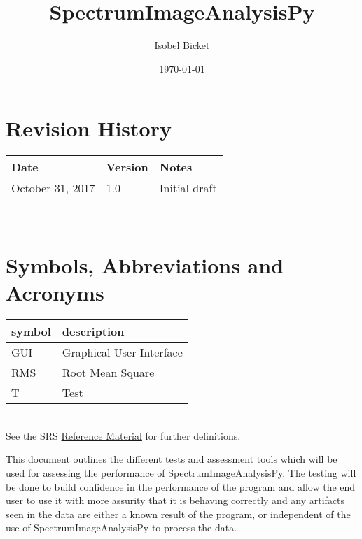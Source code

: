 \documentclass[12pt, titlepage]{article}
\newcommand{\progname}{SpectrumImageAnalysisPy}
\begin{document}

\title{SpectrumImageAnalysisPy} 
\author{Isobel Bicket}
\date{\today}
	
\maketitle


\section{Revision History}

\begin{tabularx}{\textwidth}{p{4cm}p{2cm}X}
\toprule {\bf Date} & {\bf Version} & {\bf Notes}\\
\midrule
October 31, 2017 & 1.0 & Initial draft\\
\bottomrule
\end{tabularx}

~\newpage

\section{Symbols, Abbreviations and Acronyms}

\renewcommand{\arraystretch}{1.2}
\begin{tabular}{l l} 
  \toprule		
  \textbf{symbol} & \textbf{description}\\
  \midrule 
  GUI & Graphical User Interface\\
  RMS & Root Mean Square\\
  T & Test\\
  \bottomrule
\end{tabular}\\

See the SRS \hyperref[SRS:RefMat]{Reference Material} for further definitions. 

\newpage

\tableofcontents

\listoftables

\newpage


This document outlines the different tests and assessment tools which will be
used for assessing the performance of \progname{}. The testing will be done to
build confidence in the performance of the program and allow the end user to use
it with more assurity that it is behaving correctly and any artifacts seen in
the data are either a known result of the program, or independent of the use of
\progname{} to process the data.
\end{document}
